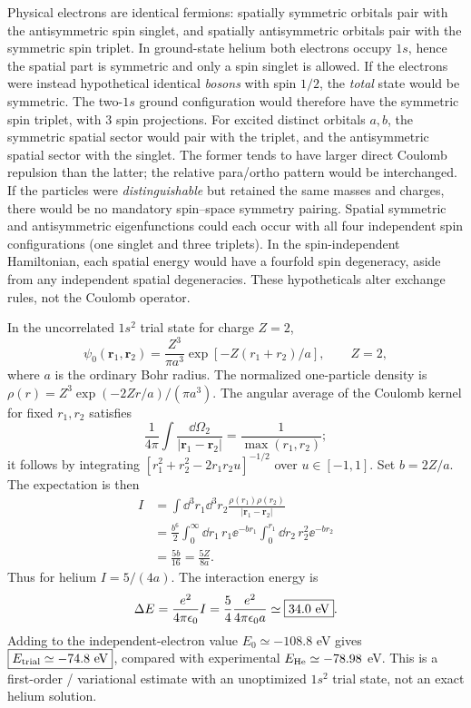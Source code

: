 Physical electrons are identical fermions:
spatially symmetric orbitals pair with the
antisymmetric spin singlet, and spatially
antisymmetric orbitals pair with the symmetric
spin triplet. In ground-state helium both
electrons occupy $1s$, hence the spatial part
is symmetric and only a spin singlet is allowed.
If the electrons were instead hypothetical
identical \emph{bosons} with spin $1/2$,
the \emph{total} state would be symmetric.
The two-$1s$ ground configuration would
therefore have the symmetric spin triplet,
with $\boxed{3}$ spin projections.
For excited distinct orbitals $a,b$,
the symmetric spatial sector would pair with
the triplet, and the antisymmetric spatial
sector with the singlet. The former tends
to have larger direct Coulomb repulsion
than the latter; the relative para/ortho
pattern would be interchanged.
If the particles were \emph{distinguishable}
but retained the same masses and charges,
there would be no mandatory spin--space
symmetry pairing. Spatial symmetric and
antisymmetric eigenfunctions could each
occur with all four independent spin
configurations (one singlet and three triplets).
In the spin-independent Hamiltonian,
each spatial energy would have a fourfold
spin degeneracy, aside from any independent
spatial degeneracies. These hypotheticals
alter exchange rules, not the Coulomb operator.

In the uncorrelated $1s^2$ trial state
for charge $Z=2$,
\begin{equation}
\psi_0(\mathbf r_1,\mathbf r_2)
=\frac{Z^3}{\pi a^3}
\exp[-Z(r_1+r_2)/a],\qquad Z=2,
\end{equation}
where $a$ is the ordinary Bohr radius.
The normalized one-particle density is
$\rho(r)=Z^3\exp(-2Zr/a)/(\pi a^3)$.
The angular average of the Coulomb kernel
for fixed $r_1,r_2$ satisfies
\begin{equation}
\frac1{4\pi}\int
\frac{\dd\Omega_2}{|\mathbf r_1-\mathbf r_2|}
=\frac1{\max(r_1,r_2)};
\end{equation}
it follows by integrating
$[r_1^2+r_2^2-2r_1r_2u]^{-1/2}$
over $u\in[-1,1]$.
Set $b=2Z/a$.
The expectation is then
\begin{align}
I&=\int\dd^3r_1\dd^3r_2
\frac{\rho(r_1)\rho(r_2)}{|\mathbf r_1-\mathbf r_2|}\\
&=\frac{b^6}{2}\int_0^\infty\dd r_1\,
r_1\ee^{-br_1}
\int_0^{r_1}\dd r_2\,r_2^2\ee^{-br_2}\\
&=\frac{5b}{16}=\frac{5Z}{8a}.
\end{align}
Thus for helium $\boxed{I=5/(4a)}$.
The interaction energy is
\begin{equation}
\Delta E=\frac{e^2}{4\pi\epsilon_0}I
=\frac54\frac{e^2}{4\pi\epsilon_0a}
\simeq\boxed{34.0\ {\rm eV}}.
\end{equation}
Adding to the independent-electron value
$E_0\simeq-108.8$ eV gives
$\boxed{E_{\rm trial}\simeq-74.8\ {\rm eV}}$,
compared with experimental
$E_{\rm He}\simeq-78.98$ eV.
This is a first-order / variational
estimate with an unoptimized $1s^2$ trial
state, not an exact helium solution.

